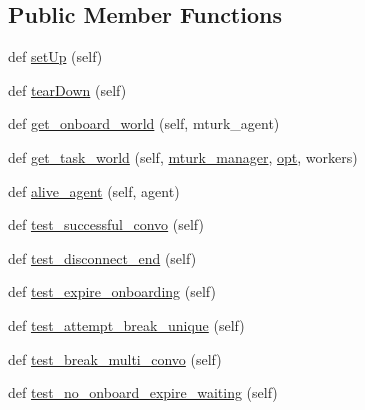 \subsection*{Public Member Functions}
\begin{DoxyCompactItemize}
\item 
def \hyperlink{classparlai_1_1mturk_1_1core_1_1dev_1_1test_1_1test__full__system_1_1TestMTurkManagerWorkflows_a97ce6f35b55b04c1615325a6f529c991}{set\+Up} (self)
\item 
def \hyperlink{classparlai_1_1mturk_1_1core_1_1dev_1_1test_1_1test__full__system_1_1TestMTurkManagerWorkflows_acaa898eaaff8df4ce648d64c3496755e}{tear\+Down} (self)
\item 
def \hyperlink{classparlai_1_1mturk_1_1core_1_1dev_1_1test_1_1test__full__system_1_1TestMTurkManagerWorkflows_ade4211d28a5583613b8dad5088a41f5a}{get\+\_\+onboard\+\_\+world} (self, mturk\+\_\+agent)
\item 
def \hyperlink{classparlai_1_1mturk_1_1core_1_1dev_1_1test_1_1test__full__system_1_1TestMTurkManagerWorkflows_a9499834ef926100c17c84ec394a01086}{get\+\_\+task\+\_\+world} (self, \hyperlink{classparlai_1_1mturk_1_1core_1_1dev_1_1test_1_1test__full__system_1_1TestMTurkManagerWorkflows_a4e9986f9517d652793fe709c3603ed78}{mturk\+\_\+manager}, \hyperlink{classparlai_1_1mturk_1_1core_1_1dev_1_1test_1_1test__full__system_1_1TestMTurkManagerWorkflows_a0f790c60b129cb00158cd49ba707a6d2}{opt}, workers)
\item 
def \hyperlink{classparlai_1_1mturk_1_1core_1_1dev_1_1test_1_1test__full__system_1_1TestMTurkManagerWorkflows_a44f3d1dcbacf90d5ed6c8f14c3ac05bf}{alive\+\_\+agent} (self, agent)
\item 
def \hyperlink{classparlai_1_1mturk_1_1core_1_1dev_1_1test_1_1test__full__system_1_1TestMTurkManagerWorkflows_a584e2c301ed81a4cd3b68520ed6e0096}{test\+\_\+successful\+\_\+convo} (self)
\item 
def \hyperlink{classparlai_1_1mturk_1_1core_1_1dev_1_1test_1_1test__full__system_1_1TestMTurkManagerWorkflows_ae7c5a42a3742d9ed616af725f87192bf}{test\+\_\+disconnect\+\_\+end} (self)
\item 
def \hyperlink{classparlai_1_1mturk_1_1core_1_1dev_1_1test_1_1test__full__system_1_1TestMTurkManagerWorkflows_ad1c8b65395e4d230f2289a0c95da5da0}{test\+\_\+expire\+\_\+onboarding} (self)
\item 
def \hyperlink{classparlai_1_1mturk_1_1core_1_1dev_1_1test_1_1test__full__system_1_1TestMTurkManagerWorkflows_af8fb1855f1850953ad500543b1a4ff5c}{test\+\_\+attempt\+\_\+break\+\_\+unique} (self)
\item 
def \hyperlink{classparlai_1_1mturk_1_1core_1_1dev_1_1test_1_1test__full__system_1_1TestMTurkManagerWorkflows_a78cac9cd90bba3563697fa94ae202d85}{test\+\_\+break\+\_\+multi\+\_\+convo} (self)
\item 
def \hyperlink{classparlai_1_1mturk_1_1core_1_1dev_1_1test_1_1test__full__system_1_1TestMTurkManagerWorkflows_aea7f86b35f032a0f71f92b6e1a207a61}{test\+\_\+no\+\_\+onboard\+\_\+expire\+\_\+waiting} (self)
\end{DoxyCompactItemize}
